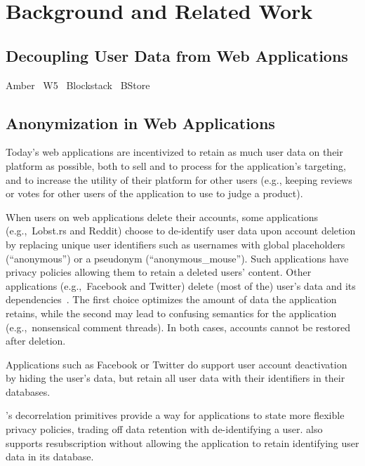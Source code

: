\section{Background and Related Work}
\subsection{Decoupling User Data from Web Applications}
Amber~\cite{amber}
W5~\cite{w5}
Blockstack~\cite{blockstack}
BStore~\cite{bstore}

\subsection{Anonymization in Web Applications}
Today's web applications are incentivized to retain as much user data on their platform as possible,
both to sell and to process for the application's targeting, and to increase the utility of their
platform for other users (e.g., keeping reviews or votes for other users of the application to use
to judge a product).

When users on web applications delete their accounts, some applications (e.g.,\ Lobst.rs and Reddit)
choose to de-identify user data upon account deletion by replacing unique user identifiers such as
usernames with global placeholders (``anonymous'') or a pseudonym (``anonymous\_mouse''). Such
applications have privacy policies allowing them to retain a deleted users' content.
Other applications (e.g.,\ Facebook and Twitter) delete (most of the) user's data and its
dependencies~\cite{delf}. 
The first choice optimizes the amount of data the application retains, while the second may lead to
confusing semantics for the application (e.g.,\ nonsensical comment threads). In both cases,
accounts cannot be restored after deletion. 

Applications such as Facebook or Twitter do support user account deactivation by hiding the user's
data, but retain all user data with their identifiers in their databases.  

\sys{}'s decorrelation primitives provide a way for applications to state more flexible privacy
policies, trading off data retention with de-identifying a user.
\sys{} also supports resubscription without allowing the application to retain identifying user data
in its database.

